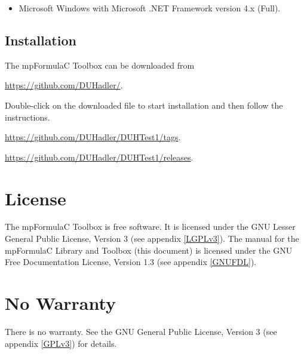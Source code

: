 \begin{itemize}
  \item Microsoft Windows with Microsoft .NET Framework version 4.x (Full).
\end{itemize}



\subsection{Installation}
\label{Installation}
The mpFormulaC Toolbox can be downloaded from 

\href{https://github.com/DUHadler/}{https://github.com/DUHadler/}. 

Double-click on the downloaded file to start installation and then follow the instructions.

\href{https://github.com/DUHadler/DUHTest1/tags}{https://github.com/DUHadler/DUHTest1/tags}. 


\href{https://github.com/DUHadler/DUHTest1/releases}{https://github.com/DUHadler/DUHTest1/releases}. 



\section{License}
\label{mpFormulaLicense}

The mpFormulaC Toolbox is free software. It is licensed under the GNU Lesser General Public License, Version 3 (see appendix \ref{LGPLv3}).
The manual for the mpFormulaC Library and Toolbox (this document) is licensed under the GNU Free Documentation License, Version 1.3 (see appendix \ref{GNUFDL}).




\section{No Warranty}
\label{No Warranty} 

There is no warranty. See the GNU General Public License, Version 3 (see appendix \ref{GPLv3}) for details.


